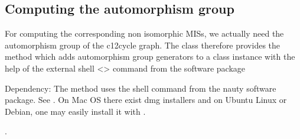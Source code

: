 \documentclass[a4paper,12pt,english]{sphinxhowto}
\begin{document}
\begin{sphinxVerbatim}[commandchars=\\\{\},numbers=left,firstnumber=1,stepnumber=1]
\end{sphinxVerbatim}


\subsection{Computing the automorphism group}
\label{\detokenize{tutorial:computing-the-automorphism-group}}
For computing the corresponding non isomorphic MISs, we actually need the automorphism group of the c12\sphinxhyphen{}cycle graph. The  class therefore provides the  method which adds automorphism group generators to a  class instance with the help of the external shell \textless{}\textgreater{} command from the  software package %
\begin{footnote}[2]\sphinxAtStartFootnote
Dependency: The  method uses the shell  command from the nauty software package. See  . On Mac OS there exist dmg installers and on Ubuntu Linux or Debian, one may easily install it with .
%
\end{footnote}.
\end{document}
